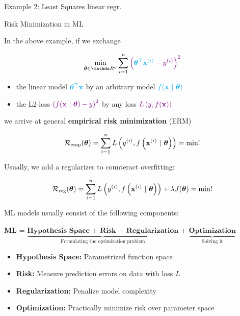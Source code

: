 \documentclass[11pt,compress,t,notes=noshow, xcolor=table]{beamer}
\begin{document}
\begin{vbframe}{Example 2: Least Squares linear regr.}
\end{vbframe}

\begin{vbframe}{Risk Minimization in ML}
	
In the above example, if we exchange

$$
\min_{\thetab \in \R^d} \sum_{i = 1}^n \textcolor{violet}{\left(\textcolor{cyan}{\thetab^\top \xi} - \yi\right)^2}
$$

\begin{itemize}
	\item the linear model $\textcolor{cyan}{\bm{\theta}^\top \mathbf{x}}$ by an arbitrary model $\textcolor{cyan}{f(\mathbf{x} ~|~ \bm{\theta})}$ %
	\item the L2-loss $\textcolor{violet}{\left(f(\mathbf{x} ~|~ \bm{\theta}) - y\right)^2}$ by any loss $\textcolor{violet}{L\left(y, f(\mathbf{x})\right)}$
\end{itemize}

\lz 

we arrive at general \textbf{empirical risk minimization} (ERM)

	$$
 \mathcal{R}_{\text{emp}}(\bm{\theta}) = \sum\limits_{i=1}^n L\left(y^{(i)}, f\left(\mathbf{x}^{(i)} ~|~ \bm{\theta}\right)\right) = \textrm{min}!
	$$

Usually, we add a regularizer to counteract overfitting:

	$$
	\mathcal{R}_{\text{reg}}(\bm{\theta}) =  \sum\limits_{i=1}^n L\left(y^{(i)}, f\left(\mathbf{x}^{(i)} ~|~ \bm{\theta}\right)\right) + \lambda J(\bm{\theta}) = \textrm{min}!
	$$



\framebreak 

ML models usually consist of the following components: 

\begin{center}

  \textbf{ML} = $\underbrace{\textbf{Hypothesis Space + Risk + Regularization}}_{\text{Formulating the optimization problem}}$ + $\underbrace{\textbf{Optimization}}_{\text{Solving it}}$ 
  
\end{center}

\lz

\begin{itemize}

  \item \textbf{Hypothesis Space:} Parametrized function space 
  \item \textbf{Risk:} Measure prediction errors on data with loss $L$
  
  \item \textbf{Regularization:} Penalize model complexity 

  \item \textbf{Optimization:} Practically minimize risk over parameter space

  
\end{itemize}

\end{vbframe}
\end{document}
